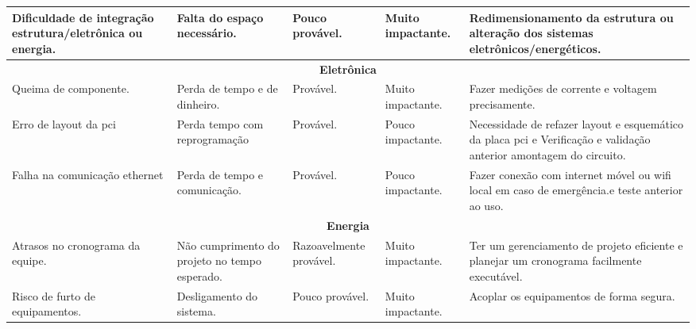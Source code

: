 \begin{longtable}{|m{2.8cm}|m{4cm}|m{2.5cm}|m{2.2cm}|m{4cm}|}
Dificuldade de integração estrutura/eletrônica ou energia. & Falta do espaço necessário.                                                                          & Pouco provável.         & Muito impactante.         & Redimensionamento da estrutura ou alteração dos sistemas eletrônicos/energéticos.                                 \\ \hline
\multicolumn{5}{|c|}{\textbf{Eletrônica}}\tabularnewline
\hline
Queima de componente. & Perda de tempo e de dinheiro.        & Provável.         & Muito impactante.         & Fazer medições de corrente e voltagem precisamente.                                 \\ \hline
Erro de layout da pci & Perda tempo com reprogramação        & Provável.         & Pouco impactante.         & Necessidade de refazer layout e esquemático da placa pci e Verificação e validação anterior amontagem do circuito.                                 \\ \hline
Falha na comunicação ethernet & Perda de tempo e comunicação.        & Provável.         & Pouco impactante.         & Fazer conexão com internet móvel ou wifi local em caso de emergência.e teste anterior ao uso.                                 \\ \hline
\multicolumn{5}{|c|}{\textbf{Energia}}\tabularnewline
\hline
Atrasos no cronograma da equipe.                                        & Não cumprimento do projeto no tempo esperado.                      & Razoavelmente provável. & Muito impactante.         & Ter um gerenciamento de projeto eficiente e planejar um cronograma facilmente executável.                                                                                                                                      \\ \hline
Risco de furto de equipamentos.                                  & Desligamento do sistema.             & Pouco provável.         & Muito impactante. & Acoplar os equipamentos de forma segura. \\ \hline


\end{longtable}
